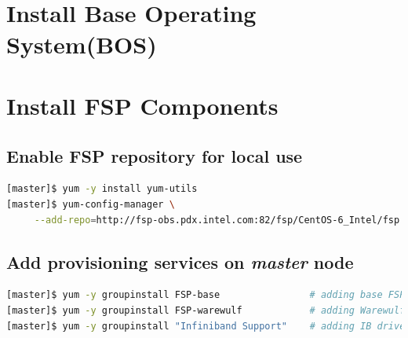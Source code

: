 \documentclass[letterpaper]{article}
\begin{document}
 \\

 \\

 


\section{Install Base Operating System(BOS)}



\section{Install FSP Components} \label{sec:basic_install}


\subsection{Enable FSP repository for local use}


\begin{lstlisting}[language=bash]
[master]$ yum -y install yum-utils
[master]$ yum-config-manager \
     --add-repo=http://fsp-obs.pdx.intel.com:82/fsp/CentOS-6_Intel/fsp.repo
\end{lstlisting}

\subsection{Add provisioning services on {\em master} node}


\begin{lstlisting}[language=bash,keywords={}]
[master]$ yum -y groupinstall FSP-base                # adding base FSP packages
[master]$ yum -y groupinstall FSP-warewulf            # adding Warewulf support
[master]$ yum -y groupinstall "Infiniband Support"    # adding IB driver support
\end{lstlisting}
\end{document}
